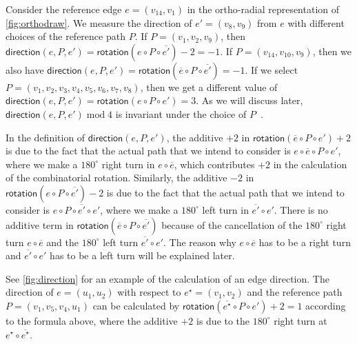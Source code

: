 \documentclass{theoretics}
\newcommand{\rotation}{\mathsf{rotation}}
\newcommand{\direction}{\mathsf{direction}}
\newcommand{\eref}{e^\star}
\renewcommand{\mod}{\operatorname{mod}}
\begin{document}
Consider the reference edge $e = (v_{14},v_1)$ in the ortho-radial representation of \cref{fig:orthodraw}. We measure the direction of $e' = (v_8, v_9)$ from $e$ with different choices of the reference path $P$. If $P = (v_1, v_2, v_9)$, then $\direction(e, P, e')= \rotation(e \circ P \circ \overline{e'})-2 = -1$. If  $P = (v_{14}, v_{10}, v_9)$, then we also have $\direction(e, P, e')= \rotation(\overline{e} \circ P \circ \overline{e'}) = -1$. If we select $P=(v_1, v_2, v_3, v_4, v_5, v_6, v_7, v_8)$, then we get a different value of $\direction(e, P, e')= \rotation({e} \circ P \circ {e'}) = 3$. As we will discuss later, $\direction(e, P, e') \mod 4$ is invariant under the choice of $P$~\cite{barth2023topology}. 

In the definition of  $\direction(e, P, e')$, the additive $+2$ in $\rotation(\overline{e} \circ P \circ e')+2$ is due to the fact that the actual path that we intend to consider is $e \circ \overline{e} \circ P \circ e'$, where we make a $180^\circ$ right turn in $e \circ \overline{e}$, which contributes $+2$ in the calculation of the combinatorial rotation. Similarly, the additive $-2$ in $\rotation(e \circ P \circ \overline{e'})-2$ is due to the fact that the actual path that we intend to consider is $e \circ P \circ \overline{e'} \circ e'$, where we make a $180^\circ$ left turn in $\overline{e'} \circ e'$. There is no additive term in $\rotation(\overline{e} \circ P \circ \overline{e'})$  because of the cancellation of the $180^\circ$ right turn $e \circ \overline{e}$ and the $180^\circ$ left turn $\overline{e'} \circ e'$. The reason why $e \circ \overline{e}$ has to be a right turn and $\overline{e'} \circ e'$ has to be a left turn will be explained later.

See \cref{fig:direction} for an example of the calculation of an edge direction. The direction of $e = (u_1, u_2)$ with respect to $\eref= (v_1,v_2)$  and the reference path  $P=(v_1, v_5, v_4, u_1)$ can be calculated by 
$\rotation(\overline{\eref} \circ P \circ e')+2=1$ according to the formula above, where the additive $+2$ is due to the $180^\circ$ right turn at $\eref \circ \overline{\eref}$.
\end{document}
